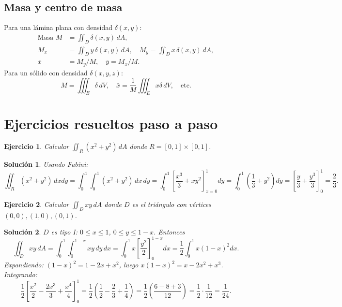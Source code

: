 \documentclass[12pt,spanish]{article}
\newtheorem{ejercicio}{Ejercicio}[section]
\newtheorem{solucion}{Solución}
\begin{document}
\subsection{Masa y centro de masa}
Para una lámina plana con densidad $\delta(x,y)$:
\begin{align*}
\text{Masa } M &= \iint_D \delta(x,y)\,dA,\\
M_x &= \iint_D y\,\delta(x,y)\,dA,\quad M_y = \iint_D x\,\delta(x,y)\,dA,\\
\bar{x} &= M_y/M,\quad \bar{y}=M_x/M.
\end{align*}
Para un sólido con densidad $\delta(x,y,z)$:
\[
M=\iiint_E \delta\,dV,\quad
\bar{x}=\frac{1}{M}\iiint_E x\delta\,dV,\quad \text{etc.}
\]

\section{Ejercicios resueltos paso a paso}

\begin{ejercicio}
Calcular $\displaystyle\iint_R (x^2+y^2)\,dA$ donde $R=[0,1]\times[0,1]$.
\end{ejercicio}
\begin{solucion}
Usando Fubini:
\[
\iint_R (x^2+y^2)\,dxdy = \int_0^1\int_0^1 (x^2+y^2)\,dx\,dy = \int_0^1\left[\frac{x^3}{3}+xy^2\right]_{x=0}^{1}dy = \int_0^1\left(\frac13+y^2\right)dy = \left[\frac{y}{3}+\frac{y^3}{3}\right]_0^1 = \frac23.
\]
\end{solucion}

\begin{ejercicio}
Calcular $\displaystyle\iint_D xy\,dA$ donde $D$ es el triángulo con vértices $(0,0),(1,0),(0,1)$.
\end{ejercicio}
\begin{solucion}
$D$ es tipo I: $0\le x\le1$, $0\le y\le1-x$. Entonces
\[
\iint_D xy\,dA = \int_0^1\int_0^{1-x} xy\,dy\,dx = \int_0^1 x\left[\frac{y^2}{2}\right]_0^{1-x}dx = \frac12\int_0^1 x(1-x)^2dx.
\]
Expandiendo: $(1-x)^2=1-2x+x^2$, luego $x(1-x)^2=x-2x^2+x^3$. Integrando:
\[
\frac12\left[\frac{x^2}{2}-\frac{2x^3}{3}+\frac{x^4}{4}\right]_0^1 = \frac12\left(\frac12-\frac23+\frac14\right)=\frac12\left(\frac{6-8+3}{12}\right)=\frac12\cdot\frac1{12}=\frac1{24}.
\]
\end{solucion}
\end{document}
